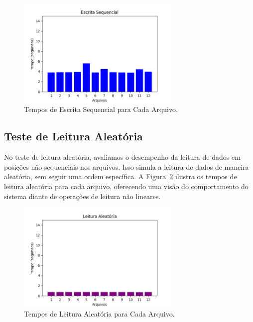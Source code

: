 \documentclass[
	12pt,				%
	openright,			%
	oneside,			%
	a4paper,			%
	chapter=TITLE,		%
	english,			%
	french,				%
	spanish,			%
	brazil				%
	]{abntex2}
\theoremstyle{definition}
\begin{document}
\begin{figure}[H]
    \centering
    \includegraphics[width=0.7\textwidth]{SeqWrite.png}
    \caption{Tempos de Escrita Sequencial para Cada Arquivo.}
    \label{fig:sw}
\end{figure}


\subsection{Teste de Leitura Aleatória}

No teste de leitura aleatória, avaliamos o desempenho da leitura de dados 
em posições não sequenciais nos arquivos. Isso simula a leitura de dados 
de maneira aleatória, sem seguir uma ordem específica. A Figura~\ref{fig:rr} 
ilustra os tempos de leitura aleatória para cada arquivo, oferecendo uma 
visão do comportamento do sistema diante de operações de leitura não lineares.

\begin{figure}[H]
    \centering
    \includegraphics[width=0.7\textwidth]{RandomRead.png}
    \caption{Tempos de Leitura Aleatória para Cada Arquivo.}
    \label{fig:rr}
\end{figure}
\end{document}
